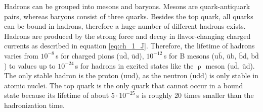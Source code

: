 Hadrons can be grouped into mesons and baryons. Mesons are quark-antiquark pairs, whereas baryons consist of three quarks. Besides the top quark, all quarks can be bound in hadrons, therefore a huge number of different hadrons exists. Hadrons are produced by the strong force and decay in flavor-changing charged currents as described in equation \ref{eq:ch_1_J}. Therefore, the lifetime of hadrons \cite{pdg} varies from $10^{-8}$\,s for charged pions (u$\bar{\textrm{d}}$, $\bar{\textrm{u}}$d), $10^{-12}$\,s for B mesons (u$\bar{\textrm{b}}$, $\bar{\textrm{u}}$b, $\bar{\textrm{b}}$d, b$\bar{\textrm{d}}$) to values up to $10^{-24}$\,s for hadrons in excited states like the $\uprho$ meson (u$\bar{\textrm{d}}$, $\bar{\textrm{u}}$d). The only stable hadron is the proton (uud), as the neutron (udd) is only stable in atomic nuclei. The top quark is the only quark that cannot occur in a bound state because its lifetime of about $5 \cdot 10^{-25}$\,s \cite{top_lifetime} is roughly 20 times smaller than the hadronization time.




